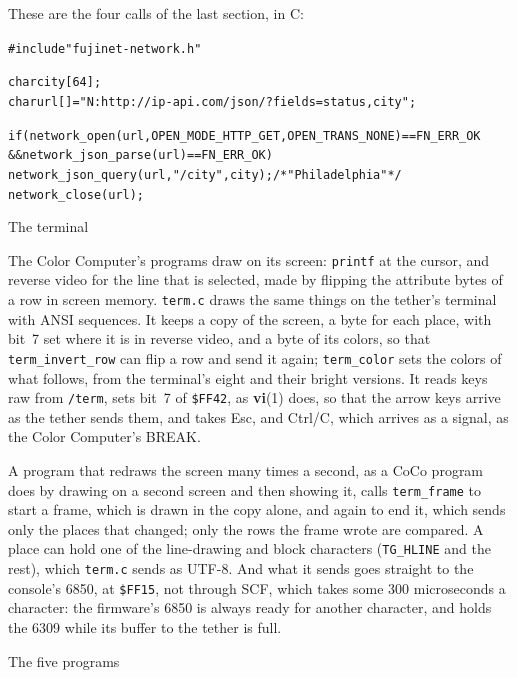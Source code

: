 \documentclass[10pt,twoside,openany]{book}
\makeatletter
\newcommand{\file}[1]{\texttt{#1}}           %
\newcommand{\key}[1]{\textsf{\small #1}}     %
\newcommand{\rp}[2]{\textbf{#1}(#2)}         %
\newenvironment{exsmall}{\par\vspace{0.3ex}\scriptsize\begin{alltt}}{\end{alltt}\vspace{0.3ex}}
\renewcommand{\subsection}{\@startsection{subsection}{2}{0pt}{2.4ex plus 0.6ex}{0.8ex}%
  {\sffamily\bfseries\normalsize}}
\makeatother
\begin{document}
These are the four calls of the last section, in C:
\begin{exsmall}
#include "fujinet-network.h"

char city[64];
char url[] = "N:http://ip-api.com/json/?fields=status,city";

if (network_open(url, OPEN_MODE_HTTP_GET, OPEN_TRANS_NONE) == FN_ERR_OK
    && network_json_parse(url) == FN_ERR_OK)
    network_json_query(url, "/city", city);       /* "Philadelphia" */
network_close(url);
\end{exsmall}

\subsection{The terminal}

The Color Computer's programs draw on its screen: \texttt{printf} at the
cursor, and reverse video for the line that is selected, made by flipping
the attribute bytes of a row in screen memory. \file{term.c} draws the same
things on the tether's terminal with ANSI sequences. It keeps a copy of the
screen, a byte for each place, with bit~7 set where it is in reverse video,
and a byte of its colors, so that \texttt{term\_invert\_row} can flip a
row and send it again; \texttt{term\_color} sets the colors of what
follows, from the terminal's eight and their bright versions. It
reads keys raw from \file{/term}, sets bit~7 of \file{\$FF42}, as
\rp{vi}{1} does, so that the arrow keys arrive as the tether sends them,
and takes \key{Esc}, and \key{Ctrl/C}, which arrives as a signal, as the
Color Computer's \key{BREAK}.

A program that redraws the screen many times a second, as a CoCo program
does by drawing on a second screen and then showing it, calls
\texttt{term\_frame} to start a frame, which is drawn in the copy alone,
and again to end it, which sends only the places that changed; only the
rows the frame wrote are compared. A place can hold one of the
line-drawing and block characters (\texttt{TG\_HLINE} and the rest), which
\file{term.c} sends as UTF-8. And what it sends goes straight to the
console's 6850, at \file{\$FF15}, not through SCF, which takes some 300
microseconds a character: the firmware's 6850 is always ready for another
character, and holds the 6309 while its buffer to the tether is full.

\subsection{The five programs}
\end{document}
